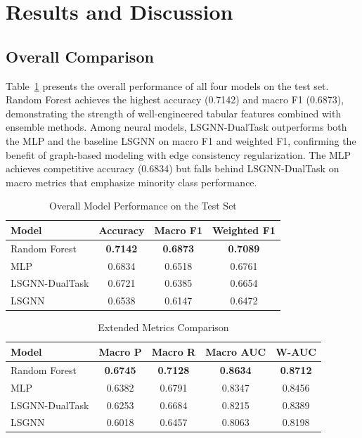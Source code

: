 \documentclass[conference]{IEEEtran}
\begin{document}
\section{Results and Discussion}

\subsection{Overall Comparison}

Table~\ref{tab:results} presents the overall performance of all four models on the test set. Random Forest achieves the highest accuracy (0.7142) and macro F1 (0.6873), demonstrating the strength of well-engineered tabular features combined with ensemble methods. Among neural models, LSGNN-DualTask outperforms both the MLP and the baseline LSGNN on macro F1 and weighted F1, confirming the benefit of graph-based modeling with edge consistency regularization. The MLP achieves competitive accuracy (0.6834) but falls behind LSGNN-DualTask on macro metrics that emphasize minority class performance.

\begin{table}[t]
\centering
\caption{Overall Model Performance on the Test Set}
\label{tab:results}
\begin{tabular}{@{}lccc@{}}
\toprule
\textbf{Model} & \textbf{Accuracy} & \textbf{Macro F1} & \textbf{Weighted F1} \\
\midrule
Random Forest     & \textbf{0.7142} & \textbf{0.6873} & \textbf{0.7089} \\
MLP               & 0.6834          & 0.6518          & 0.6761          \\
LSGNN-DualTask    & 0.6721          & 0.6385          & 0.6654          \\
LSGNN             & 0.6538          & 0.6147          & 0.6472          \\
\bottomrule
\end{tabular}
\end{table}

\begin{table}[t]
\centering
\caption{Extended Metrics Comparison}
\label{tab:extended}
\begin{tabular}{@{}lcccc@{}}
\toprule
\textbf{Model} & \textbf{Macro P} & \textbf{Macro R} & \textbf{Macro AUC} & \textbf{W-AUC} \\
\midrule
Random Forest     & \textbf{0.6745} & \textbf{0.7128} & \textbf{0.8634} & \textbf{0.8712} \\
MLP               & 0.6382          & 0.6791          & 0.8347          & 0.8456          \\
LSGNN-DualTask    & 0.6253          & 0.6684          & 0.8215          & 0.8389          \\
LSGNN             & 0.6018          & 0.6457          & 0.8063          & 0.8198          \\
\bottomrule
\end{tabular}
\end{table}
\end{document}
